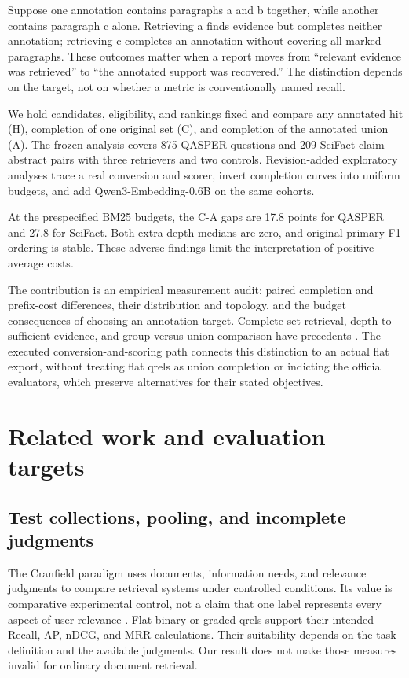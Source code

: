 \documentclass[twoside,a4paper,11pt]{article}
\begin{document}
Suppose one annotation contains paragraphs a and b together, while another contains paragraph c alone. Retrieving a finds evidence but completes neither annotation; retrieving c completes an annotation without covering all marked paragraphs. These outcomes matter when a report moves from ``relevant evidence was retrieved'' to ``the annotated support was recovered.'' The distinction depends on the target, not on whether a metric is conventionally named recall.

We hold candidates, eligibility, and rankings fixed and compare any annotated hit (H), completion of one original set (C), and completion of the annotated union (A). The frozen analysis covers 875 QASPER questions and 209 SciFact claim--abstract pairs with three retrievers and two controls. Revision-added exploratory analyses trace a real conversion and scorer, invert completion curves into uniform budgets, and add Qwen3-Embedding-0.6B on the same cohorts.

At the prespecified BM25 budgets, the C-A gaps are 17.8 points for QASPER and 27.8 for SciFact. Both extra-depth medians are zero, and original primary F1 ordering is stable. These adverse findings limit the interpretation of positive average costs.

The contribution is an empirical measurement audit: paired completion and prefix-cost differences, their distribution and topology, and the budget consequences of choosing an annotation target. Complete-set retrieval, depth to sufficient evidence, and group-versus-union comparison have precedents \citep{alt2026,li2025}. The executed conversion-and-scoring path connects this distinction to an actual flat export, without treating flat qrels as union completion or indicting the official evaluators, which preserve alternatives for their stated objectives.


\section{Related work and evaluation targets}

\subsection{Test collections, pooling, and incomplete judgments}
The Cranfield paradigm uses documents, information needs, and relevance judgments to compare retrieval systems under controlled conditions. Its value is comparative experimental control, not a claim that one label represents every aspect of user relevance \citep{voorhees2002,saracevic}. Flat binary or graded qrels support their intended Recall, AP, nDCG, and MRR calculations. Their suitability depends on the task definition and the available judgments. Our result does not make those measures invalid for ordinary document retrieval.
\end{document}
